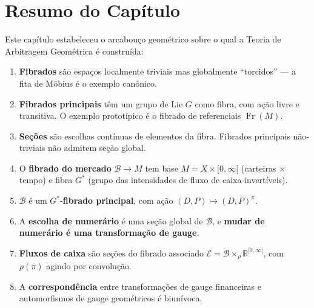 \section{Resumo do Cap\'itulo}

Este cap\'itulo estabeleceu o arcabou\c{c}o geom\'etrico sobre o qual a
Teoria de Arbitragem Geom\'etrica \'e constru\'ida:

\begin{enumerate}
 \item \textbf{Fibrados} s\~ao espa\c{c}os localmente triviais mas
 globalmente ``torcidos'' --- a fita de M\"obius \'e o exemplo
 can\^onico.
 \item \textbf{Fibrados principais} t\^em um grupo de Lie $G$ como fibra,
 com a\c{c}\~ao livre e transitiva. O exemplo protot\'ipico \'e o
 fibrado de referenciais $\operatorname{Fr}(M)$.
 \item \textbf{Se\c{c}\~oes} s\~ao escolhas cont\'inuas de elementos da
 fibra. Fibrados principais n\~ao-triviais n\~ao admitem se\c{c}\~ao
 global.
 \item O \textbf{fibrado do mercado} $\mathcal{B} \to M$ tem base
 $M = X \times [0,\infty[$ (carteiras $\times$ tempo) e fibra
 $G^*$ (grupo das intensidades de fluxo de caixa invert\'iveis).
 \item $\mathcal{B}$ \'e um $G^*$-\textbf{fibrado principal}, com
 a\c{c}\~ao $(D,P) \mapsto (D,P)^\pi$.
 \item A \textbf{escolha de numer\'ario} \'e uma se\c{c}\~ao global de
 $\mathcal{B}$, e \textbf{mudar de numer\'ario \'e uma
 transforma\c{c}\~ao de gauge}.
 \item \textbf{Fluxos de caixa} s\~ao se\c{c}\~oes do fibrado associado
 $\mathcal{E} = \mathcal{B} \times_\rho \mathbb{R}^{[0,\infty[}$,
 com $\rho(\pi)$ agindo por convolu\c{c}\~ao.
 \item A \textbf{correspond\^encia} entre transforma\c{c}\~oes de gauge
 financeiras e automorfismos de gauge geom\'etricos \'e biun\'ivoca.
\end{enumerate}

\begin{center}
\end{center}

